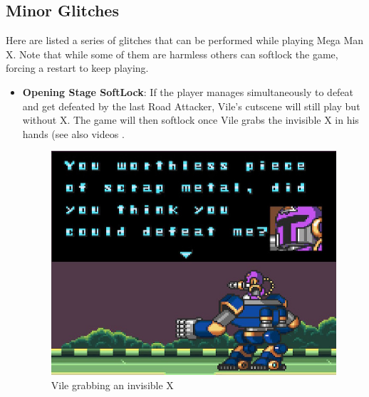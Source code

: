 \subsection{Minor Glitches}
Here are listed a series of glitches that can be performed while playing Mega Man X. Note that while some of them are harmless others can softlock the game, forcing a restart to keep playing.
\begin{itemize}
	\item \textbf{Opening Stage SoftLock}: If the player manages simultaneously to defeat and get defeated by the last Road Attacker, Vile's cutscene will still play but without X. The game will then softlock once Vile grabs the invisible X in his hands (see also videos .
	\begin{figure}[htp]
		\centering
		\includegraphics[width=0.5\linewidth]{figures/X1/Miscs/Intro_softlock.jpg}
		\caption{Vile grabbing an invisible X}
	\end{figure}
	

\end{itemize}

